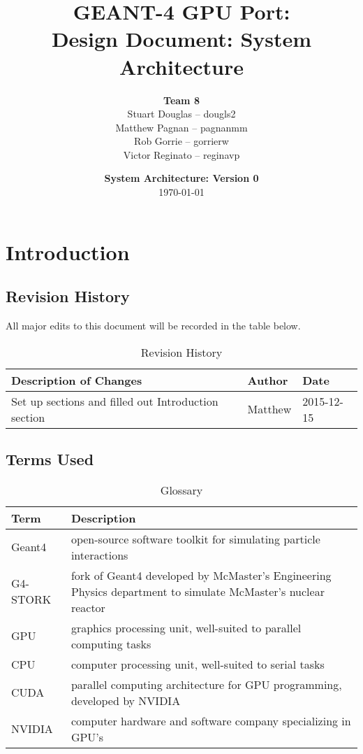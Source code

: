 \documentclass[12pt]{article}
\title{
\LARGE GEANT-4 GPU Port:
\\\vspace{10mm}
\large \textbf{Design Document: System Architecture}
\vspace{40mm}
}
\author{
\textbf{Team 8}
\\Stuart Douglas -- dougls2
\\Matthew Pagnan -- pagnanmm
\\Rob Gorrie -- gorrierw
\\Victor Reginato -- reginavp
\vspace{10mm}
}
\date{\vfill \textbf{System Architecture: Version 0}\\ \today}
\begin{document}

\maketitle
\newpage

\renewcommand{\contentsname}{Table of Contents}
\tableofcontents
\newpage
{}

\section{Introduction}%
\subsection{Revision History}
All major edits to this document will be recorded in the table below.

\begin{table}[h]
\centering
\caption{Revision History}\label{Table_Revision}
\begin{tabularx}{\textwidth}{Xll}
\toprule
\bf Description of Changes & \bf Author & \bf Date\\\midrule
Set up sections and filled out Introduction section & Matthew & 2015-12-15\\
\bottomrule
\end{tabularx}
\end{table}

\subsection{Terms Used}
\begin{table}[h]
\centering
\caption{Glossary}\label{Table_Glossary}
\begin{tabularx}{\textwidth}{lX}
\toprule
\bf Term & \bf Description\\\midrule\vspace{1mm}
Geant4 & open-source software toolkit for simulating particle interactions\\\vspace{1mm}
G4-STORK & fork of Geant4 developed by McMaster's Engineering Physics department to simulate McMaster's nuclear reactor\\\vspace{1mm}
GPU & graphics processing unit, well-suited to parallel computing tasks\\\vspace{1mm}
CPU & computer processing unit, well-suited to serial tasks\\\vspace{1mm}
CUDA & parallel computing architecture for GPU programming, developed by NVIDIA\\\vspace{1mm}
NVIDIA & computer hardware and software company specializing in GPU's\\
\bottomrule
\end{tabularx}
\end{table}
\end{document}

